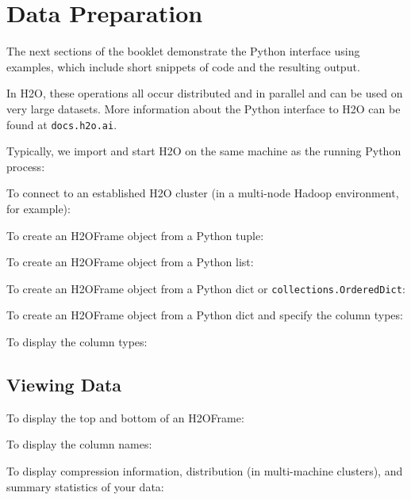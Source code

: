 {\section{Data Preparation}
The next sections of the booklet demonstrate the Python interface using examples, which include  short snippets of code and the
resulting output.  

In H2O, these operations all occur distributed and in
parallel and can be used on very large datasets.  More information about the
Python interface to H2O can be found at {\texttt{docs.h2o.ai}}.

Typically, we import and start H2O on the same machine as the running Python process:


To connect to an established H2O cluster (in a multi-node Hadoop environment, for example):


\newpage
To create an H2OFrame object from a Python tuple:


To create an H2OFrame object from a Python list:


To create an H2OFrame object from a Python dict or \texttt{collections.OrderedDict}:


To create an H2OFrame object from a Python dict and specify the column types:


To display the column types:


\subsection{Viewing Data}
To display the top and bottom of an H2OFrame:



To display the column names:


To display compression information, distribution (in multi-machine clusters), and summary statistics of your data:


}
